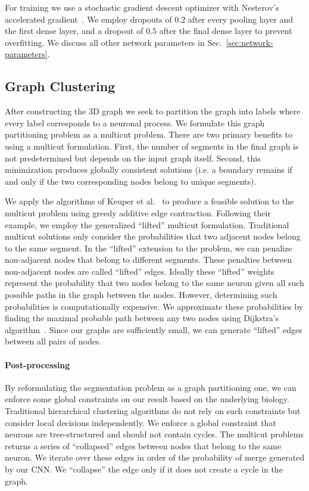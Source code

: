 For training we use a stochastic gradient descent optimizer with Nesterov's accelerated gradient~\cite{nesterov1983method}. 
We employ dropouts of $0.2$ after every pooling layer and the first dense layer, and a dropout of $0.5$ after the final dense layer to prevent overfitting. 
We discuss all other network parameters in Sec.~\ref{sec:network-parameters}.

\subsection{Graph Clustering}

After constructing the 3D graph we seek to partition the graph into labels where every label corresponds to a neuronal process. 
We formulate this graph partitioning problem as a multicut problem.
There are two primary benefits to using a multicut formulation. 
First, the number of segments in the final graph is not predetermined but depends on the input graph itself. 
Second, this minimization produces globally consistent solutions (i.e. a boundary remains if and only if the two corresponding nodes belong to unique segments).

We apply the algorithms of Keuper et al.~\cite{keuper2015efficient} to produce a feasible solution to the multicut problem using greedy additive edge contraction.
Following their example, we employ the generalized ``lifted'' multicut formulation.
Traditional multicut solutions only consider the probabilities that two adjacent nodes belong to the same segment. 
In the ``lifted'' extension to the problem, we can penalize non-adjacent nodes that belong to different segments. 
These penalties between non-adjacent nodes are called ``lifted'' edges. 
Ideally these ``lifted'' weights represent the probability that two nodes belong to the same neuron given all such possible paths in the graph between the nodes.
However, determining such probabilities is computationally expensive.
We approximate these probabilities by finding the maximal probable path between any two nodes using Dijkstra's algorithm~\cite{keuper2015efficient}.
Since our graphs are sufficiently small, we can generate ``lifted'' edges between all pairs of nodes. 

\paragraph{Post-processing}

By reformulating the segmentation problem as a graph partitioning one, we can enforce some global constraints on our result based on the underlying biology.
Traditional hierarchical clustering algorithms do not rely on such constraints but consider local decisions independently.
We enforce a global constraint that neurons are tree-structured and should not contain cycles. 
The multicut problems returns a series of ``collapsed'' edges between nodes that belong to the same neuron.
We iterate over these edges in order of the probability of merge generated by our CNN. 
We ``collapse'' the edge only if it does not create a cycle in the graph.
